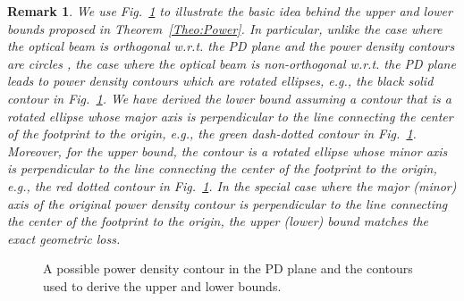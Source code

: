 \documentclass[conference]{IEEEtran}
\newtheorem{remk}{Remark}
\begin{document}
\begin{remk}
We use Fig.~\ref{Fig:Contour} to illustrate the basic idea behind the  upper and lower bounds proposed in Theorem~\ref{Theo:Power}.  In particular, unlike the case where the optical beam is orthogonal w.r.t. the PD plane and the power density contours are circles \cite{Steve_pointing_error}, the case where the optical beam is non-orthogonal w.r.t. the PD plane leads to power density contours which are \textit{rotated ellipses}, e.g., the black solid contour in Fig.~\ref{Fig:Contour}. We have derived the lower bound assuming a contour that is a rotated ellipse whose major axis is perpendicular to the line connecting the center of the footprint to the origin, e.g., the green dash-dotted contour in Fig.~\ref{Fig:Contour}. Moreover, for the upper bound, the contour is a rotated ellipse whose minor axis is perpendicular to the line connecting the center of the footprint to the origin, e.g., the red dotted contour in Fig.~\ref{Fig:Contour}. In the special case where the major (minor) axis of the \textit{original} power density contour is perpendicular to the line connecting the center of the footprint to the origin, the upper (lower) bound matches the exact geometric loss.
\end{remk}

 

\begin{figure}[t]
\centering
{}
\caption{A possible power density contour in the PD plane and the contours used to derive the upper and lower bounds.}\vspace{-0.5cm}
\label{Fig:Contour}
\end{figure}
\end{document}
